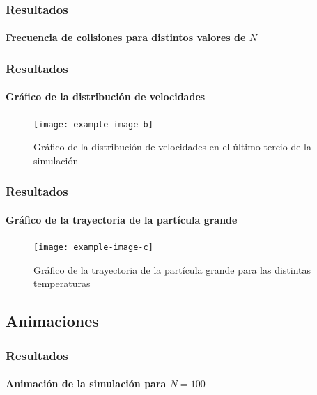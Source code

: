 \documentclass[hyperref={pdfpagelayout=SinglePage}]{beamer}
\begin{document}
\begin{frame}
\frametitle{Resultados}
\framesubtitle{Frecuencia de colisiones para distintos valores de $N$}
\begin{center}
\begin{table}[h]
\centering
{}
\caption{Frecuencia de colisiones para distintos valores de $N$.}
\end{table}
\end{center}
\end{frame}

\begin{frame}
\frametitle{Resultados}
\framesubtitle{Gráfico de la distribución de velocidades}
\begin{figure}[H]
        \centering
        \texttt{[image: example-image-b]}
        \caption{Gráfico de la distribución de velocidades en el último tercio de la simulación}
\end{figure}
\end{frame}

\begin{frame}
\frametitle{Resultados}
\framesubtitle{Gráfico de la trayectoria de la partícula grande}
\begin{figure}[H]
        \centering
        \texttt{[image: example-image-c]}
        \caption{Gráfico de la trayectoria de la partícula grande para las distintas temperaturas}
\end{figure}
\end{frame}

\subsection{Animaciones}

\begin{frame}
\frametitle{Resultados}
\framesubtitle{Animación de la simulación para $N = 100$}
\begin{figure}[H]
	\centering
\end{figure}
\end{frame}
\end{document}
